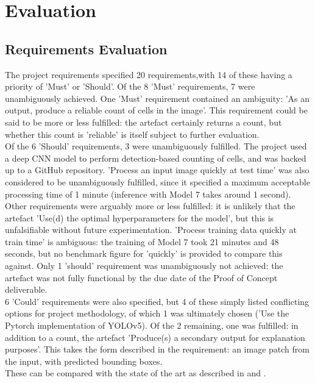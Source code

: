 
\chapter{Evaluation}
\section{Requirements Evaluation}
The project requirements specified 20 requirements,with 14 of these having a priority of 'Must' or 'Should'. Of the 8 'Must' requirements, 7 were unambiguously achieved. One 'Must' requirement contained an ambiguity: 'As an output, produce a reliable count of cells in the image'. This requirement could be said to be more or less fulfilled: the artefact certainly returns a count, but whether this count is 'reliable' is itself subject to further evaluation.\\

Of the 6 'Should' requirements, 3 were unambiguously fulfilled. The project used a deep CNN model to perform detection-based counting of cells, and was backed up to a GitHub repository. 'Process an input image quickly at test time' was also considered to be unambiguously fulfilled, since it specified a maximum acceptable processing time of 1 minute (inference with Model 7 takes around 1 second). Other requirements were arguably more or less fulfilled: it is unlikely that the artefact 'Use(d) the optimal hyperparameters for the model', but this is unfalsifiable without future experimentation. 'Process training data quickly at train time' is ambiguous: the training of Model 7 took 21 minutes and 48 seconds, but no benchmark figure for 'quickly' is provided to compare this against. Only 1 'should' requirement was unambiguously not achieved: the artefact was not fully functional by the due date of the Proof of Concept deliverable.\\

6 'Could' requirements were also specified, but 4 of these simply listed conflicting options for project methodology, of which 1 was ultimately chosen ('Use the Pytorch implementation of YOLOv5). Of the 2 remaining, one was fulfilled: in addition to a count, the artefact 'Produce(s) a secondary output for explanation purposes'. This takes the form described in the requirement: an image patch from the input, with predicted bounding boxes.\\

These can be compared with the state of the art as described in \cite{xie2018microscopy} and \cite{Identification-and-enumeration-of-cyanobacteria}.


